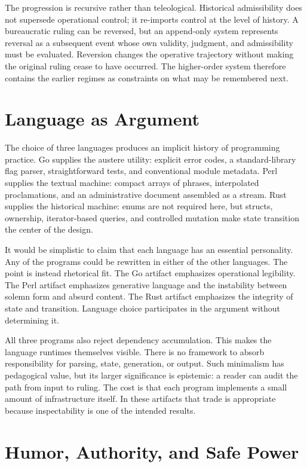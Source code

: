 \documentclass[11pt]{article}
\begin{document}
The progression is recursive rather than teleological. Historical admissibility does not supersede operational control; it re-imports control at the level of history. A bureaucratic ruling can be reversed, but an append-only system represents reversal as a subsequent event whose own validity, judgment, and admissibility must be evaluated. Reversion changes the operative trajectory without making the original ruling cease to have occurred. The higher-order system therefore contains the earlier regimes as constraints on what may be remembered next.

\section{Language as Argument}

The choice of three languages produces an implicit history of programming practice. Go supplies the austere utility: explicit error codes, a standard-library flag parser, straightforward tests, and conventional module metadata. Perl supplies the textual machine: compact arrays of phrases, interpolated proclamations, and an administrative document assembled as a stream. Rust supplies the historical machine: enums are not required here, but structs, ownership, iterator-based queries, and controlled mutation make state transition the center of the design.

It would be simplistic to claim that each language has an essential personality. Any of the programs could be rewritten in either of the other languages. The point is instead rhetorical fit. The Go artifact emphasizes operational legibility. The Perl artifact emphasizes generative language and the instability between solemn form and absurd content. The Rust artifact emphasizes the integrity of state and transition. Language choice participates in the argument without determining it.

All three programs also reject dependency accumulation. This makes the language runtimes themselves visible. There is no framework to absorb responsibility for parsing, state, generation, or output. Such minimalism has pedagogical value, but its larger significance is epistemic: a reader can audit the path from input to ruling. The cost is that each program implements a small amount of infrastructure itself. In these artifacts that trade is appropriate because inspectability is one of the intended results.

\section{Humor, Authority, and Safe Power}
\end{document}
